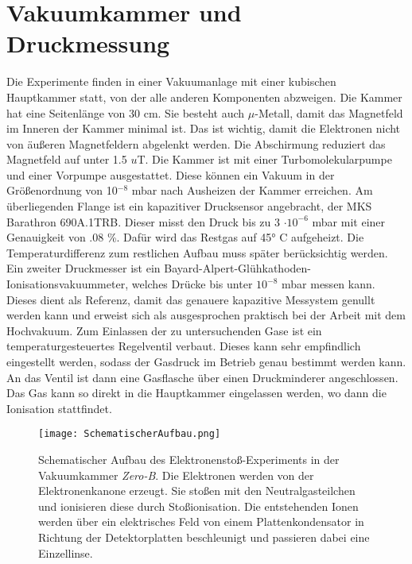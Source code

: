 \section{Vakuumkammer und Druckmessung}
Die Experimente finden in einer Vakuumanlage mit einer kubischen Hauptkammer statt, von der alle anderen Komponenten abzweigen. Die Kammer hat eine Seitenlänge von 30 cm. Sie besteht auch $\mu$-Metall, damit das Magnetfeld im Inneren der Kammer minimal ist. Das ist wichtig, damit die Elektronen nicht von äußeren Magnetfeldern abgelenkt werden. Die Abschirmung reduziert das Magnetfeld auf unter 1.5 $u$T. Die Kammer ist mit einer Turbomolekularpumpe und einer Vorpumpe ausgestattet. Diese können ein Vakuum in der Größenordnung von 10$^{-8}$ mbar nach Ausheizen der Kammer erreichen. Am überliegenden Flange ist ein kapazitiver Drucksensor angebracht, der MKS Barathron 690A.1TRB. Dieser misst den Druck bis zu 3 $\cdot 10^{-6}$ mbar mit einer Genauigkeit von .08 \%. Dafür wird das Restgas auf \ang{45} C aufgeheizt. Die Temperaturdifferenz zum restlichen Aufbau muss später berücksichtig werden. Ein zweiter Druckmesser ist ein Bayard-Alpert-Glühkathoden-Ionisationsvakuummeter, welches Drücke bis unter $10^{-8}$ mbar messen kann. Dieses dient als Referenz, damit das genauere kapazitive Messystem genullt werden kann und erweist sich als ausgesprochen praktisch bei der Arbeit mit dem Hochvakuum.
Zum Einlassen der zu untersuchenden Gase ist ein temperaturgesteuertes Regelventil verbaut. Dieses kann sehr empfindlich eingestellt werden, sodass der Gasdruck im Betrieb genau bestimmt werden kann. An das Ventil ist dann eine Gasflasche über einen Druckminderer angeschlossen. Das Gas kann so direkt in die Hauptkammer eingelassen werden, wo dann die Ionisation stattfindet.

\begin{landscape}
    \begin{figure}
        \centering
        \vspace*{-1cm}\hspace*{-1cm}\texttt{[image: SchematischerAufbau.png]}
        \caption[Schematischer Aufbau des Experiments]{Schematischer Aufbau des Elektronenstoß-Experiments in der Vakuumkammer \textit{Zero-B}. Die Elektronen werden von der Elektronenkanone erzeugt. Sie stoßen mit den Neutralgasteilchen und ionisieren diese durch Stoßionisation. Die entstehenden Ionen werden über ein elektrisches Feld von einem Plattenkondensator in Richtung der Detektorplatten beschleunigt und passieren dabei eine Einzellinse.}
        \label{fig:Aufbau}
    \end{figure}
\end{landscape}

